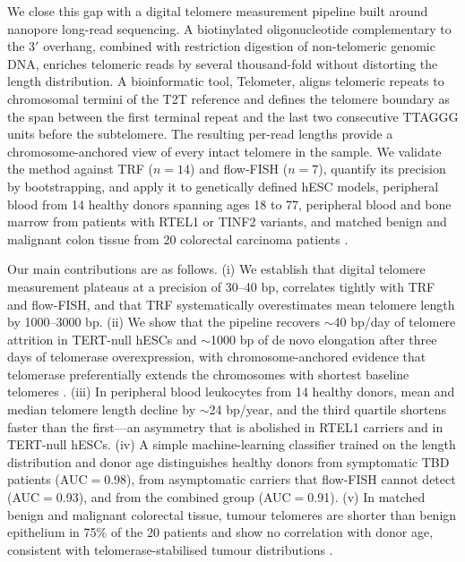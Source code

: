 We close this gap with a digital telomere measurement pipeline built around nanopore long-read sequencing. A biotinylated oligonucleotide complementary to the 3$'$ overhang, combined with restriction digestion of non-telomeric genomic DNA, enriches telomeric reads by several thousand-fold without distorting the length distribution. A bioinformatic tool, Telometer, aligns telomeric repeats to chromosomal termini of the T2T reference and defines the telomere boundary as the span between the first terminal repeat and the last two consecutive TTAGGG units before the subtelomere. The resulting per-read lengths provide a chromosome-anchored view of every intact telomere in the sample. We validate the method against TRF ($n{=}14$) and flow-FISH ($n{=}7$), quantify its precision by bootstrapping, and apply it to genetically defined hESC models, peripheral blood from 14 healthy donors spanning ages 18 to 77, peripheral blood and bone marrow from patients with RTEL1 or TINF2 variants, and matched benign and malignant colon tissue from 20 colorectal carcinoma patients \cite{walne2013constitutional,tummala2015poly,savage2008tinf2,alder2018diagnostic}.

Our main contributions are as follows. (i) We establish that digital telomere measurement plateaus at a precision of 30--40 bp, correlates tightly with TRF and flow-FISH, and that TRF systematically overestimates mean telomere length by 1000--3000 bp. (ii) We show that the pipeline recovers $\sim$40 bp/day of telomere attrition in TERT-null hESCs and $\sim$1000 bp of de novo elongation after three days of telomerase overexpression, with chromosome-anchored evidence that telomerase preferentially extends the chromosomes with shortest baseline telomeres \cite{hemann2001shortest,britt2012preferential,teixeira2004intertelomere}. (iii) In peripheral blood leukocytes from 14 healthy donors, mean and median telomere length decline by $\sim$24 bp/year, and the third quartile shortens faster than the first---an asymmetry that is abolished in RTEL1 carriers and in TERT-null hESCs. (iv) A simple machine-learning classifier trained on the length distribution and donor age distinguishes healthy donors from symptomatic TBD patients (AUC$=$0.98), from asymptomatic carriers that flow-FISH cannot detect (AUC$=$0.93), and from the combined group (AUC$=$0.91). (v) In matched benign and malignant colorectal tissue, tumour telomeres are shorter than benign epithelium in 75\% of the 20 patients and show no correlation with donor age, consistent with telomerase-stabilised tumour distributions \cite{barthel2017systematic,roka2023tumor}.

